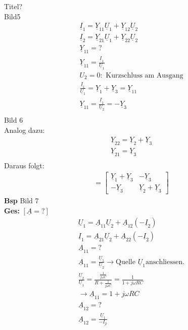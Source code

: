 Titel?\\
Bild5\\
\begin{align}
	\underline{I}_1=\underline{Y}_11\underline{U}_1+\underline{Y}_12\underline{U}_2\nonumber\\
	\underline{I}_2=\underline{Y}_21\underline{U}_1+\underline{Y}_22\underline{U}_2\nonumber\\
	\underline{Y}_{11}=?\nonumber\\
	\underline{Y}_{11}=\frac{\underline{I}_1}{\underline{U}_1}\nonumber\\
	U_2=0: \text{ Kurzschluss am Ausgang}\nonumber\\
	\frac{\underline{I}_1}{\underline{U}_1}=\underline{Y}_1+\underline{Y}_3=\underline{Y}_{11}\nonumber\\
	\underline{Y}_{11}=\frac{\underline{I}_1}{\underline{U}_2}=-\underline{Y}_3\nonumber\\
\end{align}
Bild 6\\
Analog dazu:\\
\begin{align}
	\underline{Y}_{22}=\underline{Y}_2+\underline{Y}_3\nonumber\\
	\underline{Y}_{21}=\underline{Y}_3\nonumber\\
\end{align}
Daraus folgt:
\begin{align}
	[\underline{Y}]=
	\begin{bmatrix}
		\underline{Y}_1+\underline{Y}_3 & -\underline{Y}_3\\
		-\underline{Y}_3 & \underline{Y}_2+\underline{Y}_3
	\end{bmatrix}\nonumber
\end{align}
\textbf{Bsp}
Bild 7\\
\textbf{Ges:} $[\underline{A}=?]$\\
\begin{align}
	\underline{U}_1=\underline{A}_{11}\underline{U}_2+\underline{A}_{12}\left(-\underline{I}_2\right)\nonumber\\
	\underline{I}_1=\underline{A}_{21}\underline{U}_2+\underline{A}_{22}\left(-\underline{I}_2\right)\nonumber\\
	\underline{A}_{11}=?\nonumber\\
	\underline{A}_{11}=\frac{\underline{U}_1}{\underline{U}_2} \rightarrow\text{
	Quelle } \underline{U}_1 \text{anschliessen.}\nonumber\\
	\frac{\underline{U}_2}{\underline{U}_1}=\frac{\frac{1}{j\omega
	C}}{R+\frac{1}{j\omega C}}=\frac{1}{1+j\omega RC}\nonumber\\
	\rightarrow \underline{A}_{11}=1+j\omega RC\nonumber\\
	\underline{A}_{12}=?\nonumber\\
	\underline{A}_{12}=\frac{\underline{U}_1}{-\underline{{I}_2}}\nonumber
\end{align}
